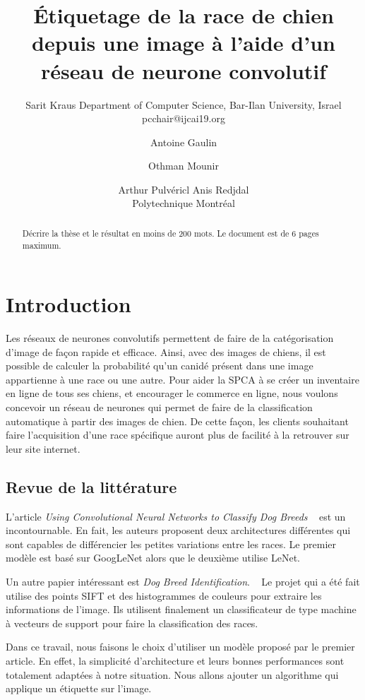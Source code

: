 \documentclass{article}
\title{Étiquetage de la race de chien depuis une image à l'aide d'un réseau de neurone convolutif}
\author{
    Sarit Kraus
    \affiliations
    Department of Computer Science, Bar-Ilan University, Israel \emails
    pcchair@ijcai19.org
}
\author{
Antoine Gaulin\and
Othman Mounir\and
Arthur Pulvéricl\And
Anis Redjdal\\
\affiliations
Polytechnique Montréal\\
}
\begin{document}
\maketitle

\begin{abstract}
Décrire la thèse et le résultat en moins de 200 mots. Le document est de 6 pages maximum.
\end{abstract}

\section{Introduction}

Les réseaux de neurones convolutifs permettent de faire de la catégorisation 
d'image de façon rapide et efficace. Ainsi, avec des images de chiens, il est possible
de calculer la probabilité qu'un canidé présent dans une image appartienne à une 
race ou une autre. Pour aider la SPCA à se créer un inventaire en ligne de tous ses
chiens, et encourager le commerce en ligne, nous voulons concevoir un réseau de
 neurones qui permet de faire de la classification automatique à partir des images
de chien. De cette façon, les clients souhaitant faire l'acquisition d'une race 
spécifique auront plus de facilité à la retrouver sur leur site internet. 

\subsection{Revue de la littérature}
L'article \textit{Using Convolutional Neural Networks to Classify Dog Breeds}
~\cite{fcdh_FinalReport} est un incontournable. En fait, les auteurs proposent 
deux architectures différentes qui sont capables de différencier les petites
variations entre les races. Le premier modèle est basé sur GoogLeNet alors que le
deuxième utilise LeNet.

Un autre papier intéressant est \textit{Dog Breed Identification}. ~\cite{output} Le
projet qui a été fait utilise des points SIFT et des histogrammes de couleurs pour
extraire les informations de l'image. Ils utilisent finalement un classificateur de type
machine à vecteurs de support pour faire la classification des races.

Dans ce travail, nous faisons le choix d'utiliser un modèle proposé par le premier
article. En effet, la simplicité d’architecture et leurs bonnes performances sont
totalement adaptées à notre situation. Nous allons ajouter un algorithme qui
applique un étiquette sur l'image.
\end{document}
